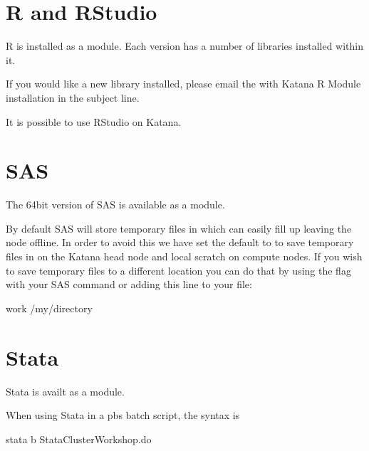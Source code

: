 \documentclass[letterpaper,10pt,english]{sphinxmanual}
\begin{document}
\section{R and RStudio}
\label{\detokenize{software/r:r-and-rstudio}}\label{\detokenize{software/r:r}}\label{\detokenize{software/r::doc}}
R is installed as a module. Each version has a number of libraries installed within it.

If you would like a new library installed, please email the  with Katana R Module installation in the subject line.

It is possible to use RStudio on Katana.


\section{SAS}
\label{\detokenize{software/sas:sas}}\label{\detokenize{software/sas::doc}}
The 64\sphinxhyphen{}bit version of SAS is available as a module.

By default SAS will store temporary files in  which can easily fill up leaving the node offline. In order to avoid this we have set the default to  to save temporary files in  on the Katana head node and local scratch on compute nodes. If you wish to save temporary files to a different location you can do that by using the  flag with your SAS command or adding this line to your  file:

\begin{sphinxVerbatim}[commandchars=\\\{\}]
\PYGZhy{}work /my/directory
\end{sphinxVerbatim}


\section{Stata}
\label{\detokenize{software/stata:stata}}\label{\detokenize{software/stata::doc}}
Stata is availt as a module.

When using Stata in a pbs batch script, the syntax is

\begin{sphinxVerbatim}[commandchars=\\\{\}]
stata \PYGZhy{}b  StataClusterWorkshop.do
\end{sphinxVerbatim}
\end{document}
